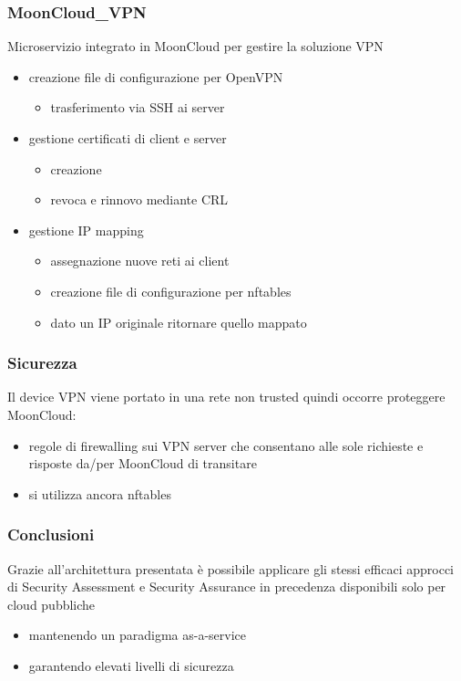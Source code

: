 \begin{frame}
	\frametitle{MoonCloud\_VPN}
	\alert{Microservizio} integrato in MoonCloud per gestire la soluzione VPN
	\begin{itemize}
		\item creazione file di \alert{configurazione} per \alert{OpenVPN}
		      \begin{itemize}
		      	\item \alert{trasferimento} via SSH ai server
		      \end{itemize}
		\item gestione \alert{certificati} di client e server
		      \begin{itemize}
		      	\item creazione
		      	\item revoca e rinnovo mediante \alert{CRL}
		      \end{itemize}
		\item gestione \alert{IP mapping}
		      \begin{itemize}
		      	\item assegnazione nuove reti ai client
		      	\item creazione file di \alert{configurazione} per \alert{nftables}
		      	\item dato un IP originale ritornare quello mappato
		      \end{itemize}
	\end{itemize}
\end{frame}

\begin{frame}
	\frametitle{Sicurezza}
	Il device VPN viene portato in una rete \alert{non trusted} quindi
	occorre \alert{proteggere MoonCloud}:
	\begin{itemize}
		\item \alert{regole di firewalling} sui VPN server che consentano
		      alle \alert{sole richieste e risposte} da/per MoonCloud di transitare
	\end{itemize}
	
	\begin{itemize}
		\item si utilizza ancora \alert{nftables}
	\end{itemize}
\end{frame}


\begin{frame}
    \frametitle{Conclusioni}
    Grazie all'architettura presentata è possibile applicare
    gli stessi efficaci approcci di \alert{Security Assessment}
    e \alert{Security Assurance} in precedenza disponibili solo per cloud pubbliche
    \begin{itemize}
        \item mantenendo un paradigma \alert{as-a-service}
        \item garantendo elevati livelli di sicurezza
    \end{itemize}
\end{frame}

